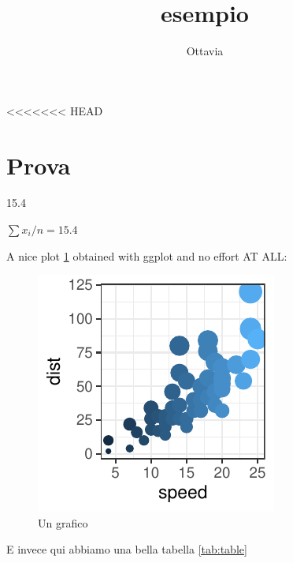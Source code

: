 \documentclass{article}
\begin{document}



<<<<<<< HEAD
\author{Ottavia}
\title{esempio}

\maketitle

\section{Prova}

\begin{Schunk}
\end{Schunk}

15.4

\verb*||

$\sum x_i / n = 15.4$


A nice plot \ref{fig:plot} obtained with ggplot and no effort AT ALL:

\begin{figure}
\caption{Un grafico}
\label{fig:plot}
\centering
\includegraphics{texProva-002}

\end{figure}

E invece qui abbiamo una bella tabella \ref{tab:table}
\end{document}
